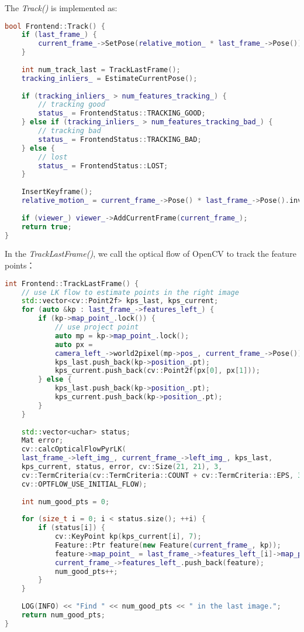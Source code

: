 The \textit{Track()} is implemented as:
\begin{lstlisting}[language=c++,caption=slambook2/ch13/src/frontend.cpp]
bool Frontend::Track() {
	if (last_frame_) {
		current_frame_->SetPose(relative_motion_ * last_frame_->Pose());
	}
	
	int num_track_last = TrackLastFrame();
	tracking_inliers_ = EstimateCurrentPose();
	
	if (tracking_inliers_ > num_features_tracking_) {
		// tracking good
		status_ = FrontendStatus::TRACKING_GOOD;
	} else if (tracking_inliers_ > num_features_tracking_bad_) {
		// tracking bad
		status_ = FrontendStatus::TRACKING_BAD;
	} else {
		// lost
		status_ = FrontendStatus::LOST;
	}
	
	InsertKeyframe();
	relative_motion_ = current_frame_->Pose() * last_frame_->Pose().inverse();
	
	if (viewer_) viewer_->AddCurrentFrame(current_frame_);
	return true;
}
\end{lstlisting}

In the \textit{TrackLastFrame()}, we call the optical flow of OpenCV to track the feature points：
\begin{lstlisting}[language=c++,caption=slambook2/ch13/src/frontend.cpp]
int Frontend::TrackLastFrame() {
	// use LK flow to estimate points in the right image
	std::vector<cv::Point2f> kps_last, kps_current;
	for (auto &kp : last_frame_->features_left_) {
		if (kp->map_point_.lock()) {
			// use project point
			auto mp = kp->map_point_.lock();
			auto px =
			camera_left_->world2pixel(mp->pos_, current_frame_->Pose());
			kps_last.push_back(kp->position_.pt);
			kps_current.push_back(cv::Point2f(px[0], px[1]));
		} else {
			kps_last.push_back(kp->position_.pt);
			kps_current.push_back(kp->position_.pt);
		}
	}
	
	std::vector<uchar> status;
	Mat error;
	cv::calcOpticalFlowPyrLK(
	last_frame_->left_img_, current_frame_->left_img_, kps_last,
	kps_current, status, error, cv::Size(21, 21), 3,
	cv::TermCriteria(cv::TermCriteria::COUNT + cv::TermCriteria::EPS, 30, 0.01),
	cv::OPTFLOW_USE_INITIAL_FLOW);
	
	int num_good_pts = 0;
	
	for (size_t i = 0; i < status.size(); ++i) {
		if (status[i]) {
			cv::KeyPoint kp(kps_current[i], 7);
			Feature::Ptr feature(new Feature(current_frame_, kp));
			feature->map_point_ = last_frame_->features_left_[i]->map_point_;
			current_frame_->features_left_.push_back(feature);
			num_good_pts++;
		}
	}
	
	LOG(INFO) << "Find " << num_good_pts << " in the last image.";
	return num_good_pts;
}
\end{lstlisting}

